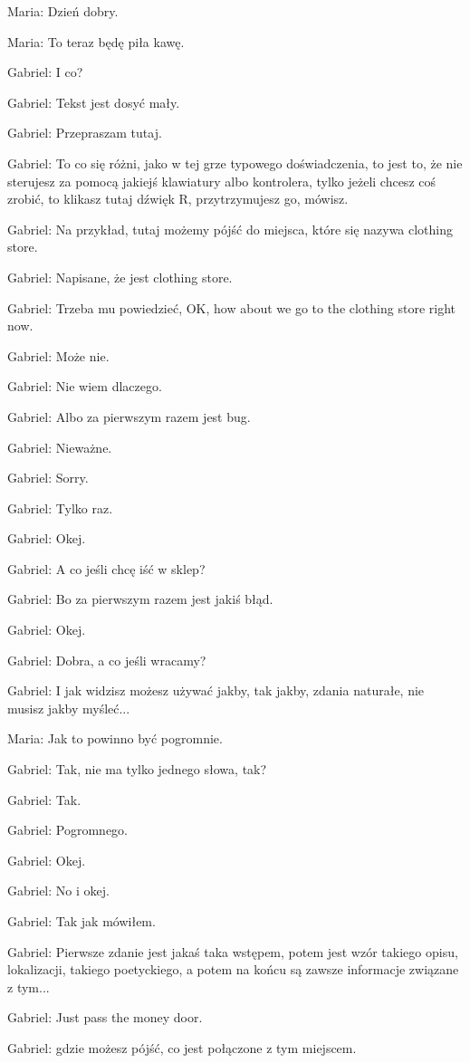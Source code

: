 Maria: Dzień dobry.

Maria: To teraz będę piła kawę.

Gabriel: I co?

Gabriel: Tekst jest dosyć mały.

Gabriel: Przepraszam tutaj.

Gabriel: To co się różni, jako w tej grze typowego doświadczenia, to jest to, że nie sterujesz za pomocą jakiejś klawiatury albo kontrolera, tylko jeżeli chcesz coś zrobić, to klikasz tutaj dźwięk R, przytrzymujesz go, mówisz.

Gabriel: Na przykład, tutaj możemy pójść do miejsca, które się nazywa clothing store.

Gabriel: Napisane, że jest clothing store.

Gabriel: Trzeba mu powiedzieć, OK, how about we go to the clothing store right now.

Gabriel: Może nie.

Gabriel: Nie wiem dlaczego.

Gabriel: Albo za pierwszym razem jest bug.

Gabriel: Nieważne.

Gabriel: Sorry.

Gabriel: Tylko raz.

Gabriel: Okej.

Gabriel: A co jeśli chcę iść w sklep?

Gabriel: Bo za pierwszym razem jest jakiś błąd.

Gabriel: Okej.

Gabriel: Dobra, a co jeśli wracamy?

Gabriel: I jak widzisz możesz używać jakby, tak jakby, zdania naturałe, nie musisz jakby myśleć...

Maria: Jak to powinno być pogromnie.

Gabriel: Tak, nie ma tylko jednego słowa, tak?

Gabriel: Tak.

Gabriel: Pogromnego.

Gabriel: Okej.

Gabriel: No i okej.

Gabriel: Tak jak mówiłem.

Gabriel: Pierwsze zdanie jest jakaś taka wstępem, potem jest wzór takiego opisu, lokalizacji, takiego poetyckiego, a potem na końcu są zawsze informacje związane z tym...

Gabriel: Just pass the money door.

Gabriel: gdzie możesz pójść, co jest połączone z tym miejscem.

